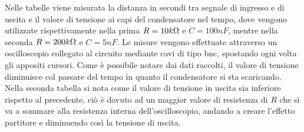 Nelle tabelle viene misurata la distanza in secondi tra segnale di ingresso e di uscita e il valore di tensione ai capi del condensatore nel tempo, dove vengono utilizzate rispettivamente nella prima $R = 10 k\ohm$ e $C = 100 nF$, mentre nella seconda $R = 200 k\ohm$ e $C = 5 nF$. Le misure vengono effettuate attraverso un oscilloscopio collegato al circuito mediante cavi di tipo bnc, spostando ogni volta gli appositi cursori. 
Come è possibile notare dai dati raccolti, il valore di tensione diminuisce col passare del tempo in quanto il condensatore si sta scaricando. Nella seconda tabella si nota come il valore di tensione in uscita sia inferiore rispetto al precedente, ciò è dovuto ad un maggior valore di resistenza di $R$ che si va a sommare alla resistenza interna dell’oscilloscopio, andando a creare l’effetto partitore e diminuendo così la tensione di uscita.

